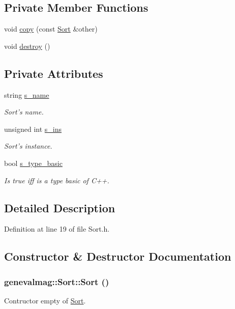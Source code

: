 \subsection*{Private Member Functions}
\begin{DoxyCompactItemize}
\item 
void \hyperlink{classgenevalmag_1_1Sort_ab9686f0d43855db1167b7cf634d9d1fa}{copy} (const \hyperlink{classgenevalmag_1_1Sort}{Sort} \&other)
\item 
void \hyperlink{classgenevalmag_1_1Sort_ac9c0f0525a72b060e253409712eafd70}{destroy} ()
\end{DoxyCompactItemize}
\subsection*{Private Attributes}
\begin{DoxyCompactItemize}
\item 
string \hyperlink{classgenevalmag_1_1Sort_ae6d8c2bf79cf548f731bbd4d7d9b1f4e}{s\_\-name}
\begin{DoxyCompactList}\small\item\em Sort's name. \item\end{DoxyCompactList}\item 
unsigned int \hyperlink{classgenevalmag_1_1Sort_adc3a9ea4bfaabbb0879c18172f670ef8}{s\_\-ins}
\begin{DoxyCompactList}\small\item\em Sort's instance. \item\end{DoxyCompactList}\item 
bool \hyperlink{classgenevalmag_1_1Sort_a063c9ca680a72b50a2018473d3be47c7}{s\_\-type\_\-basic}
\begin{DoxyCompactList}\small\item\em Is true iff is a type basic of C++. \item\end{DoxyCompactList}\end{DoxyCompactItemize}


\subsection{Detailed Description}


Definition at line 19 of file Sort.h.



\subsection{Constructor \& Destructor Documentation}
\hypertarget{classgenevalmag_1_1Sort_ae16fdd544e5e88954b272d746014b34f}{
\subsubsection[{Sort}]{\setlength{\rightskip}{0pt plus 5cm}genevalmag::Sort::Sort ()}}
\label{classgenevalmag_1_1Sort_ae16fdd544e5e88954b272d746014b34f}
Contructor empty of \hyperlink{classgenevalmag_1_1Sort}{Sort}. 

